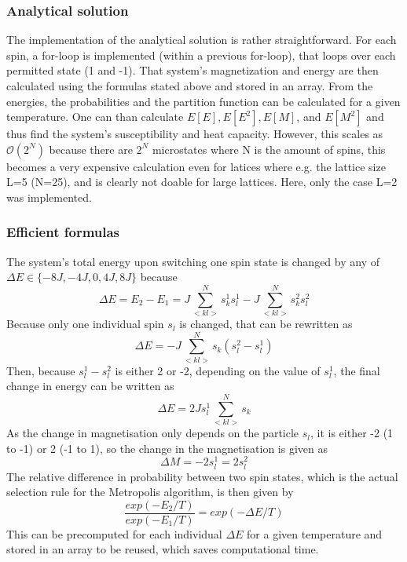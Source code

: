 \documentclass[10pt,a4paper]{article}
\begin{document}
\subsubsection{Analytical solution}
The implementation of the analytical solution is rather straightforward. For each spin, a for-loop is implemented (within a previous for-loop), that loops over each permitted state (1 and -1). That system's magnetization and energy are then calculated using the formulas stated above and stored in an array. From the energies, the probabilities and the partition function can be calculated for a given temperature. One can than calculate $E[E],E[E^2],E[M]$, and $E[M^2]$ and thus find the system's susceptibility and heat capacity. However, this scales as $\mathcal{O}(2^N)$ because there are  $2^N$ microstates where N is the amount of spins, this becomes a very expensive calculation even for latices where e.g. the lattice size L=5 (N=25), and is clearly not doable for large lattices. Here, only the case L=2 was implemented.
\subsubsection{Efficient formulas}
The system's total energy upon switching one spin state is changed by any of $\Delta E \in \{-8J,-4J,0,4J,8J\}$ because 
$$\Delta E=E_2-E_1=J\sum_{<kl>}^Ns_k^1s_l^1-J\sum_{<kl>}^Ns_k^2s_l^2$$
Because only one individual spin $s_l$ is changed, that can be rewritten as 
$$\Delta E=-J\sum_{<kl>}^Ns_k(s_l^2-s_l^1)$$
Then, because $s_l^1-s_l^2$ is either 2 or -2, depending on the value of $s_l^1$, the final change in energy can be written as 
$$\Delta E=2Js_l^1\sum_{<kl>}^Ns_k$$
As the change in magnetisation only depends on the particle $s_l$, it is either -2 (1 to -1) or 2 (-1 to 1), so the change in the magnetisation is given as 
$$\Delta M=-2s_l^1=2s_l^2$$
The relative difference in probability between two spin states, which is the actual selection rule for the Metropolis algorithm, is then given by  
$$\frac{exp(-E_2/T)}{exp(-E_1/T)}=exp(-\Delta E/T)$$
This can be precomputed for each individual $\Delta E$ for a given temperature and stored in an array to be reused, which saves computational time. 
\end{document}
